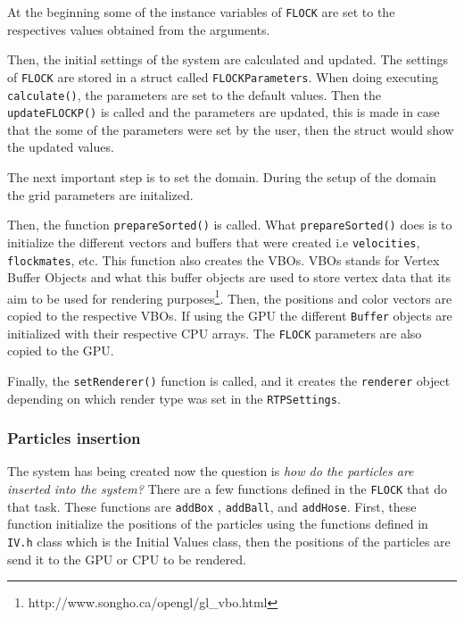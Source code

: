 At the beginning some of the instance variables of \texttt{FLOCK} are set to the respectives values obtained from the arguments. 

Then, the initial settings of the system are calculated and updated. The settings of \texttt{FLOCK} are stored in a struct called \texttt{FLOCKParameters}. When doing executing \texttt{calculate()}, the parameters are set to the default values. Then the \texttt{updateFLOCKP()} is called and the parameters are updated, this is made in case that the some of the parameters were set by the user, then the struct would show the updated values. 

The next important step is to set the domain. During the setup of the domain the grid parameters are initalized.

Then, the function \texttt{prepareSorted()} is called. What \texttt{prepareSorted()} does is to initialize the different vectors and buffers that were created i.e \texttt{velocities}, \texttt{flockmates}, etc. This function also creates the VBOs. VBOs stands for Vertex Buffer Objects and what this buffer objects are used to store vertex data that its aim to be used for rendering purposes\footnote{http://www.songho.ca/opengl/gl\_vbo.html}. Then, the positions and color vectors are copied to the respective VBOs. If using the GPU the different \texttt{Buffer} objects are initialized with their respective CPU arrays. The \texttt{FLOCK} parameters are also copied to the GPU. 

Finally, the \texttt{setRenderer()} function is called, and it creates the \texttt{renderer} object depending on which render type was set in the \texttt{RTPSettings}.


\subsubsection{Particles insertion}
The system has being created now the question is \textit{how do the particles are inserted into the system?} There are a few functions defined in the \texttt{FLOCK} that do that task. These functions are \texttt{addBox} , \texttt{addBall}, and \texttt{addHose}. First, these function initialize the positions of the particles using the functions defined in \texttt{IV.h} class which is the Initial Values class, then the positions of the particles are send it to the GPU or CPU to be rendered. 

